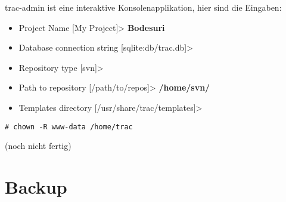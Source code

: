 \documentclass[a4paper,12pt,halfparskip,DIV14]{scrreprt}
\begin{document}
trac-admin ist eine interaktive Konsolenapplikation, hier sind die Eingaben:

\begin{itemize}
	\item Project Name [My Project]> \textbf{Bodesuri}
	\item Database connection string [sqlite:db/trac.db]>
	\item Repository type [svn]>
	\item Path to repository [/path/to/repos]> \textbf{/home/svn/}
	\item Templates directory [/usr/share/trac/templates]>
\end{itemize}

\begin{verbatim}
# chown -R www-data /home/trac
\end{verbatim}

(noch nicht fertig)


\chapter{Backup} %
\label{cha:backup}

\end{document}

